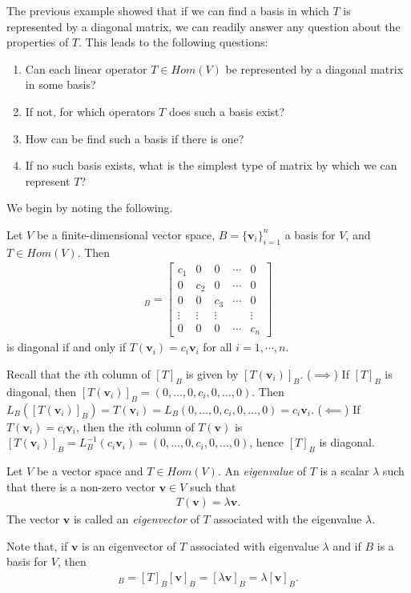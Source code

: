 \documentclass[12pt,letterpaper,reqno]{article}
\numberwithin{equation}{section}
\newcommand{\bv}{\mathbf{v}}
\begin{document}
The previous example showed that if we can find a basis in which $T$ is represented by a diagonal matrix, we can readily answer any question about the properties of $T$. This leads to the following questions:
\begin{enumerate}[(1)]
	\item Can each linear operator $T \in Hom(V)$ be represented by a diagonal matrix in some basis?
	\item If not, for which operators $T$ does such a basis exist?
	\item How can be find such a basis if there is one?
	\item If no such basis exists, what is the simplest type of matrix by which we can represent $T$?
\end{enumerate}
We begin by noting the following.
\begin{prop}
Let $V$ be a finite-dimensional vector space, $B=\{\bv_i\}_{i=1}^n$ a basis for $V$, and $T \in Hom(V)$. Then
\begin{align*}
	[T]_B=\begin{bmatrix}
		c_1 & 0 & 0 & \cdots & 0 \\
		0 & c_2 & 0 & \cdots & 0 \\
		0 & 0 & c_3 & \cdots & 0 \\
		\vdots & \vdots & \vdots
		 & & \vdots \\
		 0 & 0 & 0 & \cdots & c_n
	\end{bmatrix}
\end{align*}
is diagonal if and only if $T(\bv_i)=c_i\bv_i$ for all $i=1,\cdots,n$.	
\end{prop}

\begin{pf}
Recall that the $i$th column of $[T]_B$ is given by $[T(\bv_i)]_B$. ($\implies$) If $[T]_B$ is diagonal, then $[T(\bv_i)]_B=(0, \dots, 0, c_i,0,\dots,0)$. Then $L_B([T(\bv_i)]_B)=T(\bv_i)=L_B(0, \dots, 0, c_i,0,\dots,0)=c_i\bv_i$. ($\impliedby$) If $T(\bv_i)=c_i\bv_i$, then the $i$th column of $T(\bv)$ is $[T(\bv_i)]_B=L_B^{-1}(c_i\bv_i)=	(0, \dots, 0, c_i,0,\dots,0)$, hence $[T]_B$ is diagonal.
\end{pf}

\begin{defn}
Let $V$ be a vector space and $T \in Hom(V)$. An \emph{eigenvalue} of $T$ is a scalar $\lambda$ such that there is a non-zero vector $\bv \in V$ such that 
	\begin{align*}
		T(\bv)=\lambda\bv.
	\end{align*}
The vector $\bv$ is called an \emph{eigenvector} of $T$ associated with the eigenvalue $\lambda$. 
\end{defn}
Note that, if $\bv$ is an eigenvector of $T$ associated with eigenvalue $\lambda$ and if $B$ is a basis for $V$, then 
\begin{align*}
[T(\bv)]_B=[T]_B[\bv]_B=[\lambda\bv]_B=\lambda[\bv]_B.
\end{align*}
\end{document}
